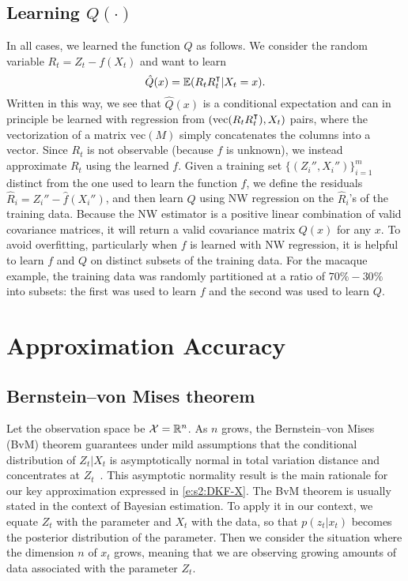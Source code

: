 \subsection{Learning $Q(\cdot)$} In all cases, we learned the function $Q$ as follows.  We consider the random variable $R_t=Z_t-f(X_t)$ and want to learn
\[ \hat Q(x) = \operatorname{\mathbb{E}}(R_tR_t^\intercal|X_t=x) . \]
Written in this way, we see that $\hat Q(x)$ is a conditional expectation and can in principle be learned with regression from $(\text{vec}(R_tR_t^\intercal),X_t)$ pairs, where the vectorization of a matrix $\text{vec}(M)$ simply concatenates the columns into a vector. Since $R_t$ is not observable (because $f$ is unknown), we instead approximate $R_t$ using the learned $f$.   Given a  training set $\{(Z_i'',X_i'')\}_{i=1}^m$ distinct from the one used to learn the function $f$, we define the residuals $\hat R_i=Z_i''-\hat f(X_i'')$, and then learn $Q$ using NW regression on the $\hat R_i$'s of the training data.  Because the NW estimator is a positive linear combination of valid covariance matrices, it will return a valid covariance matrix $Q(x)$ for any $x$.  To avoid overfitting, particularly when $f$ is learned with NW regression, it is helpful to learn $f$ and $Q$ on distinct subsets of the training data.   For the macaque example, the training data was randomly partitioned at a ratio of $70\%-30\%$ into subsets: the first was used to learn $f$ and the second was used to learn $Q$.

\section{Approximation Accuracy} 

\subsection{Bernstein--von Mises theorem} \label{s:BVM}  

Let the observation space be ${\mathcal{X}}=\mathbb{R}^n$. As $n$ grows, the Bernstein--von Mises (BvM) theorem guarantees under mild assumptions that the conditional distribution of $Z_t|X_t$ is asymptotically normal in total variation distance and concentrates at $Z_t$~\cite{vdV98}. This asymptotic normality result is the main rationale for our key approximation expressed in \eqref{e:s2:DKF-X}. The BvM theorem is usually stated in the context of Bayesian estimation. To apply it in our context, we equate $Z_t$ with the parameter and $X_t$ with the data, so that $p(z_t|x_t)$ becomes the posterior distribution of the parameter. Then we consider the situation where the dimension $n$ of $x_t$ grows, meaning that we are observing growing amounts of data associated with the parameter $Z_t$. 

